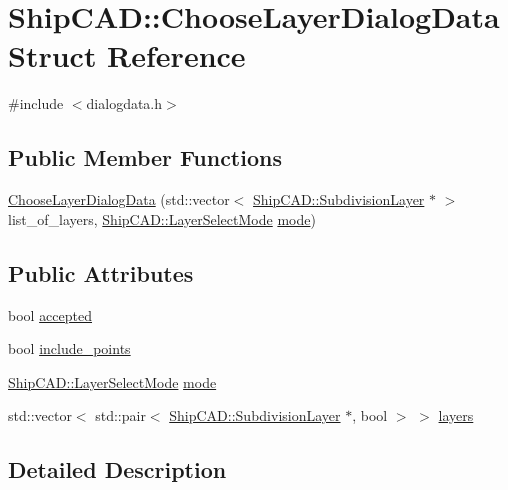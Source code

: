 \hypertarget{structShipCAD_1_1ChooseLayerDialogData}{}\section{Ship\+C\+AD\+:\+:Choose\+Layer\+Dialog\+Data Struct Reference}
\label{structShipCAD_1_1ChooseLayerDialogData}


{\ttfamily \#include $<$dialogdata.\+h$>$}

\subsection*{Public Member Functions}
\begin{DoxyCompactItemize}
\item 
\hyperlink{structShipCAD_1_1ChooseLayerDialogData_a1faf3c871500ab2e85809ddebd3f3342}{Choose\+Layer\+Dialog\+Data} (std\+::vector$<$ \hyperlink{classShipCAD_1_1SubdivisionLayer}{Ship\+C\+A\+D\+::\+Subdivision\+Layer} $\ast$ $>$ list\+\_\+of\+\_\+layers, \hyperlink{namespaceShipCAD_a33e1c54e3609477478431b6a4c106804}{Ship\+C\+A\+D\+::\+Layer\+Select\+Mode} \hyperlink{structShipCAD_1_1ChooseLayerDialogData_a02ef288b4786baafa763a397c6d5dc59}{mode})
\end{DoxyCompactItemize}
\subsection*{Public Attributes}
\begin{DoxyCompactItemize}
\item 
bool \hyperlink{structShipCAD_1_1ChooseLayerDialogData_a96cae0954fbe02423cdaee90c5983da2}{accepted}
\item 
bool \hyperlink{structShipCAD_1_1ChooseLayerDialogData_a24787e5e75c8a507eb02c5152dcf1209}{include\+\_\+points}
\item 
\hyperlink{namespaceShipCAD_a33e1c54e3609477478431b6a4c106804}{Ship\+C\+A\+D\+::\+Layer\+Select\+Mode} \hyperlink{structShipCAD_1_1ChooseLayerDialogData_a02ef288b4786baafa763a397c6d5dc59}{mode}
\item 
std\+::vector$<$ std\+::pair$<$ \hyperlink{classShipCAD_1_1SubdivisionLayer}{Ship\+C\+A\+D\+::\+Subdivision\+Layer} $\ast$, bool $>$ $>$ \hyperlink{structShipCAD_1_1ChooseLayerDialogData_abf3c16e3322c1f9b93822204dd2ee825}{layers}
\end{DoxyCompactItemize}


\subsection{Detailed Description}


